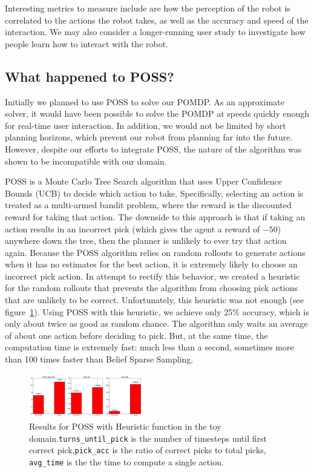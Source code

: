 \documentclass[conference]{IEEEtran}
\begin{document}
Interesting metrics to measure include are how the perception of the robot is correlated to the actions the robot takes, as well as the accuracy and speed of the interaction. We may also consider a longer-running user study to investigate how people learn how to interact with the robot. 

\subsection{What happened to POSS?} \label{sec:poss}

Initially we planned to use POSS to solve our POMDP. As an approximate solver, it would have been possible to solve the POMDP at speeds quickly enough for real-time user interaction. In addition, we would not be limited by short planning horizons, which prevent our robot from planning far into the future. However, despite our efforts to integrate POSS, the nature of the algorithm was shown to be incompatible with our domain. 

POSS is a Monte Carlo Tree Search algorithm that uses Upper Confidence Bounds (UCB) to decide which action to take. Specifically, selecting an action is treated as a multi-armed bandit problem, where the reward is the discounted reward for taking that action. The downside to this approach is that if taking an action results in an incorrect pick (which gives the agent a reward of $-50$) anywhere down the tree, then the planner is unlikely to ever try that action again. Because the POSS algorithm relies on random rollouts to generate actions when it has no estimates for the best action, it is extremely likely to choose an incorrect pick action. In attempt to rectify this behavior, we created a heuristic for the random rollouts that prevents the algorithm from choosing pick actions that are unlikely to be correct. Unfortunately, this heuristic was not enough (see figure~\ref{fig:poss_results}). Using POSS with this heuristic, we achieve only 25\% accuracy, which is only about twice as good as random chance. The algorithm only waits an average of about one action before deciding to pick. But, at the same time, the computation time is extremely fast: much less than a second, sometimes more than 100 times faster than Belief Sparse Sampling. 

\begin{figure}[H]
	\begin{center}
		\includegraphics[width=0.45\textwidth]{poss_results}
		\caption{Results for POSS with Heuristic function in the toy domain.\texttt{turns\_until\_pick} is the number of timesteps until first correct pick,\texttt{pick\_acc} is the ratio of correct picks to total picks, \texttt{avg\_time} is the the time to compute a single action.} 
		\label{fig:poss_results}
	\end{center}
\end{figure}
\end{document}
